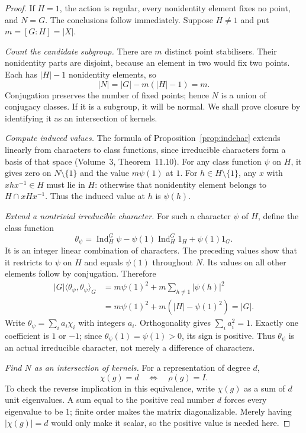 \begin{proof}
If $H=1$, the action is regular, every nonidentity element fixes no point, and $N=G$. The conclusions follow immediately. Suppose $H\ne1$ and put $m=[G:H]=|X|$.

\emph{Count the candidate subgroup.}
There are $m$ distinct point stabilisers. Their nonidentity parts are disjoint, because an element in two would fix two points. Each has $|H|-1$ nonidentity elements, so
\[
|N|=|G|-m(|H|-1)=m.
\]
Conjugation preserves the number of fixed points; hence $N$ is a union of conjugacy classes. If it is a subgroup, it will be normal. We shall prove closure by identifying it as an intersection of kernels.

\emph{Compute induced values.}
The formula of Proposition~\ref{prop:indchar} extends linearly from characters to class functions, since irreducible characters form a basis of that space (Volume~3, Theorem~11.10). For any class function $\psi$ on $H$, it gives zero on $N\setminus\{1\}$ and the value $m\psi(1)$ at $1$. For $h\in H\setminus\{1\}$, any $x$ with $xhx^{-1}\in H$ must lie in $H$: otherwise that nonidentity element belongs to $H\cap xHx^{-1}$. Thus the induced value at $h$ is $\psi(h)$.

\emph{Extend a nontrivial irreducible character.}
For such a character $\psi$ of $H$, define the class function
\[
\theta_\psi=\operatorname{Ind}_H^G\psi
-\psi(1)\operatorname{Ind}_H^G1_H+\psi(1)1_G.
\]
It is an integer linear combination of characters. The preceding values show that it restricts to $\psi$ on $H$ and equals $\psi(1)$ throughout $N$. Its values on all other elements follow by conjugation. Therefore
\begin{align*}
|G|\langle\theta_\psi,\theta_\psi\rangle_G
&=m\psi(1)^2+m\sum_{h\ne1}|\psi(h)|^2\\
&=m\psi(1)^2+m(|H|-\psi(1)^2)=|G|.
\end{align*}
Write $\theta_\psi=\sum_i a_i\chi_i$ with integers $a_i$. Orthogonality gives $\sum_i a_i^2=1$. Exactly one coefficient is $1$ or $-1$; since $\theta_\psi(1)=\psi(1)>0$, its sign is positive. Thus $\theta_\psi$ is an actual irreducible character, not merely a difference of characters.

\emph{Find $N$ as an intersection of kernels.}
For a representation of degree $d$,
\[
\chi(g)=d\quad\Longleftrightarrow\quad\rho(g)=I.
\]
To check the reverse implication in this equivalence, write $\chi(g)$ as a sum of $d$ unit eigenvalues. A sum equal to the positive real number $d$ forces every eigenvalue to be $1$; finite order makes the matrix diagonalizable. Merely having $|\chi(g)|=d$ would only make it scalar, so the positive value is needed here.


\end{proof}
